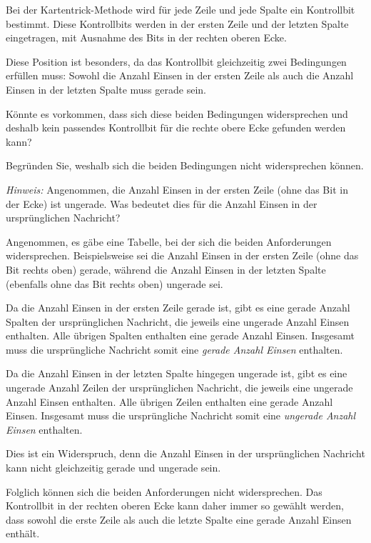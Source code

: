 \begin{mychallenge}
	Bei der Kartentrick-Methode wird für jede Zeile und jede Spalte
	ein Kontrollbit bestimmt. Diese Kontrollbits werden in der ersten
	Zeile und der letzten Spalte eingetragen, mit Ausnahme des Bits
	in der rechten oberen Ecke.

	Diese Position ist besonders, da das Kontrollbit gleichzeitig
	zwei Bedingungen erfüllen muss: Sowohl die Anzahl Einsen in
	der ersten Zeile als auch die Anzahl Einsen in der letzten
	Spalte muss gerade sein.

	Könnte es vorkommen, dass sich diese beiden Bedingungen
	widersprechen und deshalb kein passendes Kontrollbit für
	die rechte obere Ecke gefunden werden kann?

	Begründen Sie, weshalb sich die beiden Bedingungen nicht
	widersprechen können.

	\emph{Hinweis:} Angenommen, die Anzahl Einsen in der ersten
	Zeile (ohne das Bit in der Ecke) ist ungerade. Was bedeutet
	dies für die Anzahl Einsen in der ursprünglichen Nachricht?

	\begin{myanswer}
		Angenommen, es gäbe eine Tabelle, bei der sich die beiden
		Anforderungen widersprechen. Beispielsweise sei die Anzahl
		Einsen in der ersten Zeile (ohne das Bit rechts oben) gerade,
		während die Anzahl Einsen in der letzten Spalte (ebenfalls
		ohne das Bit rechts oben) ungerade sei.

		Da die Anzahl Einsen in der ersten Zeile gerade ist, gibt es
		eine gerade Anzahl Spalten der ursprünglichen Nachricht,
		die jeweils eine ungerade Anzahl Einsen enthalten.
		Alle übrigen Spalten enthalten eine gerade Anzahl Einsen.
		Insgesamt muss die ursprüngliche Nachricht somit eine
		\emph{gerade Anzahl Einsen} enthalten.

		Da die Anzahl Einsen in der letzten Spalte hingegen ungerade
		ist, gibt es eine ungerade Anzahl Zeilen der ursprünglichen
		Nachricht, die jeweils eine ungerade Anzahl Einsen enthalten.
		Alle übrigen Zeilen enthalten eine gerade Anzahl Einsen.
		Insgesamt muss die ursprüngliche Nachricht somit eine
		\emph{ungerade Anzahl Einsen} enthalten.

		Dies ist ein Widerspruch, denn die Anzahl Einsen in der
		ursprünglichen Nachricht kann nicht gleichzeitig gerade
		und ungerade sein.

		Folglich können sich die beiden Anforderungen nicht
		widersprechen. Das Kontrollbit in der rechten oberen Ecke
		kann daher immer so gewählt werden, dass sowohl die erste
		Zeile als auch die letzte Spalte eine gerade Anzahl Einsen
		enthält.
	\end{myanswer}
\end{mychallenge}








